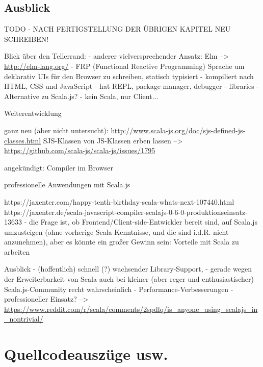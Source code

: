 \documentclass[a4paper, 12pt, hidelinks, listof=totoc, listoftables=totoc, bibliography=totoc]{scrreprt}
\begin{document}
\section{Ausblick}

TODO - NACH FERTIGSTELLUNG DER ÜBRIGEN KAPITEL NEU SCHREIBEN!

Blick über den Tellerrand:
- anderer vielversprechender Ansatz: Elm
	-->  \url{http://elm-lang.org/}
	- FRP (Functional Reactive Programming) Sprache um deklarativ UIs für den Browser zu schreiben, statisch typisiert
	- kompiliert nach HTML, CSS und JavaScript
	- hat REPL, package manager, debugger
	- libraries
	- Alternative zu Scala.js? - kein Scala, nur Client...



Weiterentwicklung

	ganz neu (aber nicht untersucht): \url{http://www.scala-js.org/doc/sjs-defined-js-classes.html}
	SJS-Klassen von JS-Klassen erben lassen  -->  \url{https://github.com/scala-js/scala-js/issues/1795}
	
	
	angekündigt: Compiler im Browser\cite{doeraene2014.WHB}
	



professionelle Anwendungen mit Scala.js

		https://jaxenter.com/happy-tenth-birthday-scala-whats-next-107440.html
	https://jaxenter.de/scala-javascript-compiler-scalajs-0-6-0-produktionseinsatz-13633
	- die Frage ist, ob Frontend/Client-side-Entwickler bereit sind, auf Scala.js umzusteigen (ohne vorherige Scala-Kenntnisse, und die sind i.d.R. nicht anzunehmen), aber es könnte ein großer Gewinn sein: Vorteile mit Scala zu arbeiten\cite{doeraene2013.CSJ}




Ausblick
  - (hoffentlich) schnell (?) wachsender Library-Support, 
     	- gerade wegen der Erweiterbarkeit von Scala auch bei kleiner (aber reger und enthusiastischer) Scala.js-Community  recht wahrscheinlich
  - Performance-Verbesserungen
  - professioneller Einsatz?
    -->  \url{https://www.reddit.com/r/scala/comments/2spdlq/is_anyone_using_scalajs_in_nontrivial/}






\appendix
\chapter{Quellcodeauszüge usw.}
\end{document}
